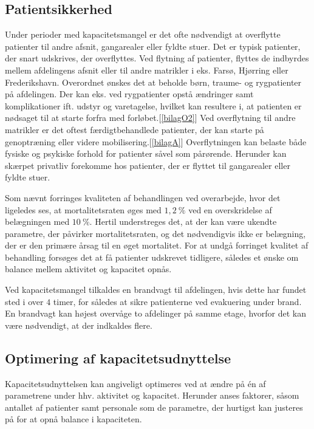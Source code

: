 \subsection{Patientsikkerhed}\label{patsik}
Under perioder med kapacitetsmangel er det ofte nødvendigt at overflytte patienter til andre afsnit, gangarealer eller fyldte stuer. Det er typisk patienter, der snart udskrives, der overflyttes. Ved flytning af patienter, flyttes de indbyrdes mellem afdelingens afsnit eller til andre matrikler i eks. Farsø, Hjørring eller Frederikshavn. Overordnet ønskes det at beholde børn, traume- og rygpatienter på afdelingen. Der kan eks. ved rygpatienter opstå ændringer samt komplikationer ift. udstyr og varetagelse, hvilket kan resultere i, at patienten er nødsaget til at starte forfra med forløbet.[\ref{bilagO2}] Ved overflytning til andre matrikler er det oftest færdigtbehandlede patienter, der kan starte på genoptræning eller videre mobilisering.[\ref{bilagA}] Overflytningen kan belaste både fysiske og psykiske forhold for patienter såvel som pårørende\cite{Heidmann2014}. Herunder kan skærpet privatliv forekomme hos patienter, der er flyttet til gangarealer eller fyldte stuer\cite{Madsen2014}. 

Som nævnt forringes kvaliteten af behandlingen ved overarbejde, hvor det ligeledes ses, at mortalitetsraten øges med $1,2~\%$ ved en overskridelse af belægningen med $10~\%$\cite{Madsen2014}. Hertil understreges det, at der kan være ukendte parametre, der påvirker mortalitetsraten, og det nødvendigvis ikke er belægning, der er den primære årsag til en øget mortalitet. For at undgå forringet kvalitet af behandling forsøges det at få patienter udskrevet tidligere, således et ønske om balance mellem aktivitet og kapacitet opnås.


Ved kapacitetsmangel tilkaldes en brandvagt til afdelingen, hvis dette har fundet sted i over $4$ timer, for således at sikre patienterne ved evakuering under brand. En brandvagt kan højest overvåge to afdelinger på samme etage, hvorfor det kan være nødvendigt, at der indkaldes flere.\cite{Beredskab2016}


\subsection{Optimering af kapacitetsudnyttelse}
Kapacitetsudnyttelsen kan angiveligt optimeres ved at ændre på én af parametrene under hhv. aktivitet og kapacitet. Herunder anses faktorer, såsom antallet af patienter samt personale som de parametre, der hurtigst kan justeres på for at opnå balance i kapaciteten. 

